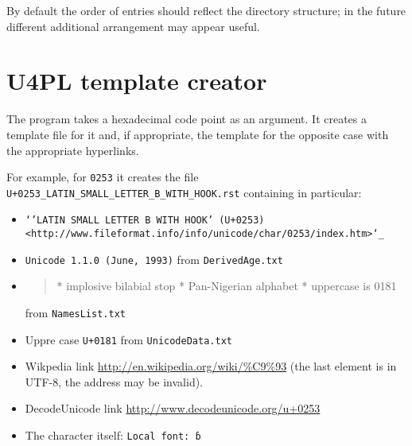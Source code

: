 \documentclass[12]{mwart}
\begin{document}
By default the order of entries should reflect the directory
structure; in the future different additional arrangement may appear
useful.



\section{U4PL template creator}
\label{sec:u4pl-templ-creat}

The program takes a hexadecimal code point as an argument. It creates
a template file for it and, if appropriate, the template for the
opposite case with the appropriate hyperlinks.

For example, for \texttt{0253} it creates the file
\texttt{U+0253_LATIN_SMALL_LETTER_B_WITH_HOOK.rst} containing in
particular:

\begin{itemize}
\item \texttt{`'LATIN SMALL LETTER B WITH HOOK' (U+0253) <http://www.fileformat.info/info/unicode/char/0253/index.htm>`_
}
\item \texttt{Unicode 1.1.0 (June, 1993)}
from \texttt{DerivedAge.txt}
\item 
  \begin{quote}
    \obeylines
    	* implosive bilabial stop
	* Pan-Nigerian alphabet
	* uppercase is 0181
  \end{quote}
from \texttt{NamesList.txt}
\item Uppre case \texttt{U+0181} from \texttt{UnicodeData.txt}
\item Wikpedia link \url{http://en.wikipedia.org/wiki/%C9%93} (the last element is in UTF-8, the address may be invalid).
\item DecodeUnicode link \url{http://www.decodeunicode.org/u+0253}
\item The character itself: \texttt{Local font: ɓ}


\end{itemize}
\end{document}
